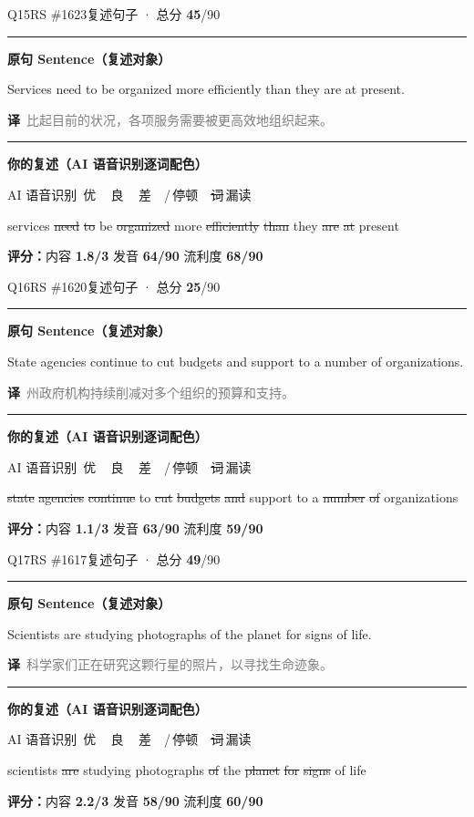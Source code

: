 \documentclass[11pt]{article}
\newcommand{\sfull}[1]{\textcolor{cFix}{\bfseries #1}}     %
\newcommand{\spart}[1]{\textcolor{cPartial}{\bfseries #1}} %
\newcommand{\ptesub}[1]{%
  \par\needspace{2\baselineskip}\smallskip
  {\color{cAccent}\rule[-0.2ex]{3pt}{1.05em}}\hspace{6pt}%
  {\bfseries\color{cHead}#1}\par\nopagebreak\smallskip}
\newcommand{\sg}[1]{\textcolor{cSpkGood}{#1}}   %
\newcommand{\sy}[1]{\textcolor{cSpkOk}{#1}}     %
\newcommand{\smiss}[1]{\textcolor{cSpkBad}{\sout{#1}}}  %
\newcommand{\asrlegend}{{\footnotesize\color{gray}AI 语音识别\quad
  {\color{cSpkGood}\textbullet}\,优\ \ {\color{cSpkOk}\textbullet}\,良\ \
  {\color{cSpkBad}\textbullet}\,差\ \ {\color{gray}/}\,停顿\ \
  {\color{cSpkBad}\sout{词}}\,漏读}}
\newcommand{\zh}[1]{{\footnotesize\textcolor{cNote}{\textbf{译}}\ \textcolor{gray}{#1}}}
\begin{document}
\begin{qblock}{Q15\quad RS \#1623}{复述句子 · 总分 \textcolor{cAccent}{\bfseries 45}/90}
\ptesub{原句 Sentence（复述对象）}
\begin{promptbox}
Services need to be organized more efficiently than they are at present.
\end{promptbox}
\zh{比起目前的状况，各项服务需要被更高效地组织起来。}
\ptesub{你的复述（AI 语音识别逐词配色）}
\asrlegend
\begin{asrbox}
\sy{services} \smiss{need} \smiss{to} \sg{be} \smiss{organized} \sg{more} \smiss{efficiently} \smiss{than} \sg{they} \smiss{are} \smiss{at} \sg{present}
\end{asrbox}
\smallskip
{\small\textbf{评分：}内容 \spart{1.8/3} \quad\textperiodcentered\quad 发音 \sfull{64/90} \quad\textperiodcentered\quad 流利度 \sfull{68/90}}
\end{qblock}

\begin{qblock}{Q16\quad RS \#1620}{复述句子 · 总分 \textcolor{cAccent}{\bfseries 25}/90}
\ptesub{原句 Sentence（复述对象）}
\begin{promptbox}
State agencies continue to cut budgets and support to a number of organizations.
\end{promptbox}
\zh{州政府机构持续削减对多个组织的预算和支持。}
\ptesub{你的复述（AI 语音识别逐词配色）}
\asrlegend
\begin{asrbox}
\smiss{state} \smiss{agencies} \smiss{continue} \sy{to} \smiss{cut} \smiss{budgets} \smiss{and} \sg{support} \sg{to} \sg{a} \smiss{number} \smiss{of} \sg{organizations}
\end{asrbox}
\smallskip
{\small\textbf{评分：}内容 \spart{1.1/3} \quad\textperiodcentered\quad 发音 \sfull{63/90} \quad\textperiodcentered\quad 流利度 \spart{59/90}}
\end{qblock}

\begin{qblock}{Q17\quad RS \#1617}{复述句子 · 总分 \textcolor{cAccent}{\bfseries 49}/90}
\ptesub{原句 Sentence（复述对象）}
\begin{promptbox}
Scientists are studying photographs of the planet for signs of life.
\end{promptbox}
\zh{科学家们正在研究这颗行星的照片，以寻找生命迹象。}
\ptesub{你的复述（AI 语音识别逐词配色）}
\asrlegend
\begin{asrbox}
\sy{scientists} \smiss{are} \sg{studying} \sy{photographs} \smiss{of} \sg{the} \smiss{planet} \smiss{for} \smiss{signs} \sg{of} \sg{life}
\end{asrbox}
\smallskip
{\small\textbf{评分：}内容 \spart{2.2/3} \quad\textperiodcentered\quad 发音 \spart{58/90} \quad\textperiodcentered\quad 流利度 \sfull{60/90}}\quad{\footnotesize\color{gray}（录音 0:15，用时 00:24）}
\end{qblock}
\end{document}
